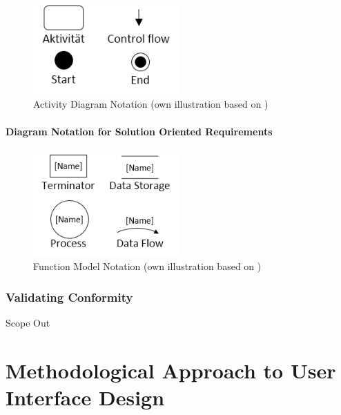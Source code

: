 \paragraph{} 
\begin{figure}
    \centering
    \includegraphics[width=0.5\textwidth]{img/adSymb.png}
    \caption[Activity Diagram Notation]{Activity Diagram Notation (own illustration based on \cite[160]{Pohl.2007})}
    \label{fig:adSymb}
\end{figure}
\clearpage
\subsubsection{Diagram Notation for Solution Oriented Requirements}
\paragraph{} 
\begin{figure}
    \centering
    \includegraphics[width=0.5\textwidth]{img/fmSymb.png}
    \caption[Function Model Notation]{Function Model Notation (own illustration based on \cite[190]{Pohl.2007})}
    \label{fig:fmSymb}
\end{figure}
\clearpage
\subsection{Validating Conformity}
Scope Out
\clearpage
\chapter{Methodological Approach to User Interface Design}

